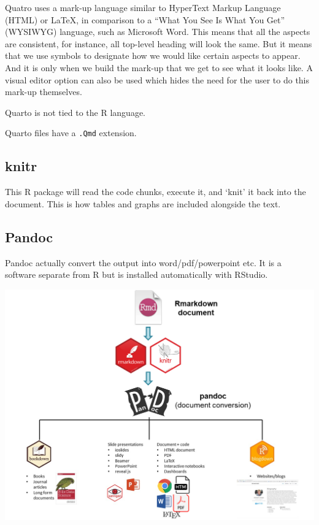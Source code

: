 \documentclass[
  letterpaper,
  DIV=11,
  numbers=noendperiod,
  oneside]{scrreprt}
\begin{document}
Quatro uses a mark-up language similar to HyperText Markup Language
(HTML) or LaTeX, in comparison to a ``What You See Is What You Get''
(WYSIWYG) language, such as Microsoft Word. This means that all the
aspects are consistent, for instance, all top-level heading will look
the same. But it means that we use symbols to designate how we would
like certain aspects to appear. And it is only when we build the mark-up
that we get to see what it looks like. A visual editor option can also
be used which hides the need for the user to do this mark-up themselves.

Quarto is not tied to the R language.

Quarto files have a \texttt{.Qmd} extension.

\subsection{knitr}

This R package will read the code chunks, execute it, and `knit' it back
into the document. This is how tables and graphs are included alongside
the text.

\subsection{Pandoc}

Pandoc actually convert the output into word/pdf/powerpoint etc. It is a
software separate from R but is installed automatically with RStudio.

\includegraphics{images/paste-ABFB521E.png}
\end{document}
